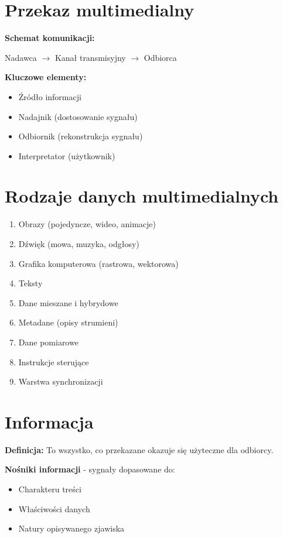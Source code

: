 \documentclass[11pt,a4paper]{article}
\begin{document}
\section{Przekaz multimedialny}
\textbf{Schemat komunikacji:}
\begin{center}
Nadawca $\rightarrow$ Kanał transmisyjny $\rightarrow$ Odbiorca
\end{center}

\textbf{Kluczowe elementy:}
\begin{itemize}[noitemsep]
    \item Źródło informacji
    \item Nadajnik (dostosowanie sygnału)
    \item Odbiornik (rekonstrukcja sygnału)
    \item Interpretator (użytkownik)
\end{itemize}

\section{Rodzaje danych multimedialnych}
\begin{enumerate}[noitemsep]
    \item Obrazy (pojedyncze, wideo, animacje)
    \item Dźwięk (mowa, muzyka, odgłosy)
    \item Grafika komputerowa (rastrowa, wektorowa)
    \item Teksty
    \item Dane mieszane i hybrydowe
    \item Metadane (opisy strumieni)
    \item Dane pomiarowe
    \item Instrukcje sterujące
    \item Warstwa synchronizacji
\end{enumerate}

\section{Informacja}
\textbf{Definicja:} To wszystko, co przekazane okazuje się użyteczne dla odbiorcy.

\textbf{Nośniki informacji} - sygnały dopasowane do:
\begin{itemize}[noitemsep]
    \item Charakteru treści
    \item Właściwości danych
    \item Natury opisywanego zjawiska
\end{itemize}
\end{document}
